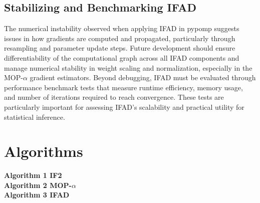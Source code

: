 \documentclass[11pt]{report}
\begin{document}
\section{Stabilizing and Benchmarking IFAD}
The numerical instability observed when applying IFAD in pypomp suggests issues in how gradients are computed and propagated, particularly through resampling and parameter update steps. Future development should ensure differentiability of the computational graph across all IFAD components and manage numerical stability in weight scaling and normalization, especially in the MOP-$\alpha$ gradient estimators. Beyond debugging, IFAD must be evaluated through performance benchmark tests that measure runtime efficiency, memory usage, and number of iterations required to reach convergence. These tests are particularly important for assessing IFAD's scalability and practical utility for statistical inference.


\newpage


\renewcommand \bibname{Reference}


\vspace{1cm}
\normalsize



\newpage
\appendix
{}
\chapter{Algorithms}
\noindent\textbf{Algorithm 1 IF2} \\[0.5em]
\noindent\textbf{Algorithm 2 MOP-$\alpha$} \\[0.5em]
\noindent\textbf{Algorithm 3 IFAD} \\[0.5em]
\end{document}
